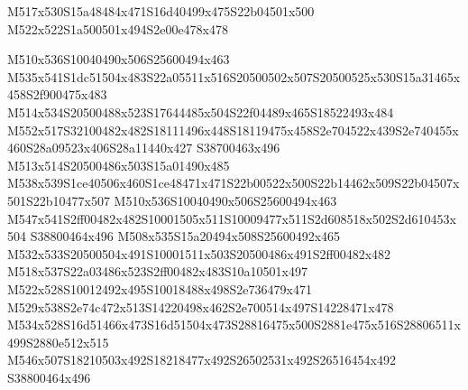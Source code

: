 \documentclass{article}
\begin{document}
\begin{multicols}{2}






\begin{center}
M517x530S15a48484x471S16d40499x475S22b04501x500 M522x522S1a500501x494S2e00e478x478 
\end{center}



M510x536S10040490x506S25600494x463 M535x541S1dc51504x483S22a05511x516S20500502x507S20500525x530S15a31465x458S2f900475x483 M514x534S20500488x523S17644485x504S22f04489x465S18522493x484 M552x517S32100482x482S18111496x448S18119475x458S2e704522x439S2e740455x460S28a09523x406S28a11440x427 S38700463x496 M513x514S20500486x503S15a01490x485 M538x539S1ce40506x460S1ce48471x471S22b00522x500S22b14462x509S22b04507x501S22b10477x507 M510x536S10040490x506S25600494x463 M547x541S2ff00482x482S10001505x511S10009477x511S2d608518x502S2d610453x504 S38800464x496 M508x535S15a20494x508S25600492x465 M532x533S20500504x491S10001511x503S20500486x491S2ff00482x482 M518x537S22a03486x523S2ff00482x483S10a10501x497 M522x528S10012492x495S10018488x498S2e736479x471 M529x538S2e74c472x513S14220498x462S2e700514x497S14228471x478 M534x528S16d51466x473S16d51504x473S28816475x500S2881e475x516S28806511x499S2880e512x515 M546x507S18210503x492S18218477x492S26502531x492S26516454x492 S38800464x496



\end{multicols}
\end{document}
